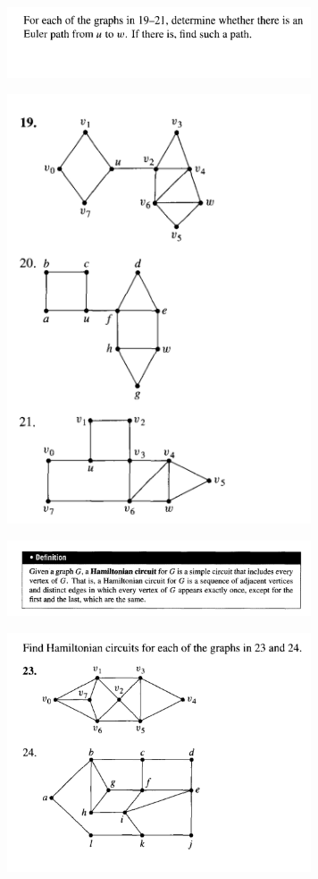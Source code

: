 \documentclass{article}
\begin{document}
\begin{figure}
\centering
\includegraphics[width=90mm]{9}
\end{figure}

\begin{figure}
\centering
\includegraphics[width=90mm]{10}
\end{figure}

\begin{figure}
\centering
\includegraphics[width=90mm]{11}
\end{figure}

\begin{figure}
\centering
\includegraphics[width=90mm]{12}
\end{figure}
\end{document}

